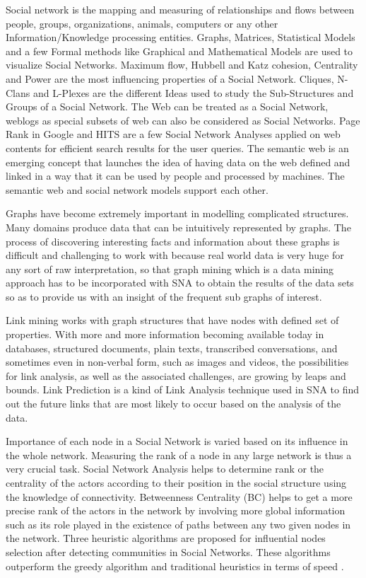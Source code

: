 Social network is the mapping and measuring of relationships and flows between people, groups, organizations, animals, computers or any other Information/Knowledge processing entities. Graphs, Matrices, Statistical Models and a few Formal methods like Graphical and Mathematical Models are used to visualize Social Networks. Maximum flow, Hubbell and Katz cohesion, Centrality and Power are the most influencing properties of a Social Network. Cliques, N-Clans and L-Plexes are the different Ideas used to study the Sub-Structures and Groups of a Social Network. The Web can be treated as a Social Network, weblogs as special subsets of web can also be considered as Social Networks. Page Rank in Google and HITS are a few Social Network Analyses applied on web contents for efficient search results for the user queries. The semantic web is an emerging concept that launches the idea of having data on the web defined and linked in a way that it can be used by people and processed by machines. The semantic web and social network models support each other.


Graphs have become extremely important in modelling complicated structures. Many domains produce data that can be intuitively represented by graphs. The process of discovering interesting facts and information about these graphs is difficult and challenging to work with because real world data is very huge for any sort of raw interpretation, so that graph mining which is a data mining approach has to be incorporated with SNA to obtain the results of the data sets so as to provide us with an insight of the frequent sub graphs of interest.

\pagebreak
{}

Link mining works with graph structures that have nodes with defined set of properties. With more and more information becoming available today in databases, structured documents, plain texts, transcribed conversations, and sometimes even in non-verbal form, such as images and videos, the possibilities for link analysis, as well as the associated challenges, are growing by leaps and bounds. Link Prediction is a kind of Link Analysis technique used in SNA to find out the future links that are most likely to occur based on the analysis of the data.


Importance of each node in a Social Network is varied based on its influence in the whole network. Measuring the rank of a node in any large network is thus a very crucial task. Social Network Analysis helps to determine rank or the centrality of the actors according to their position in the social structure using the knowledge of connectivity. Betweenness Centrality (BC) helps to get a more precise rank of the actors in the network by involving more global information such as its role played in the existence of paths between any two given nodes in the network. Three heuristic algorithms are proposed for influential nodes selection after detecting communities in Social Networks. These algorithms outperform the greedy algorithm and traditional heuristics in terms of speed .

